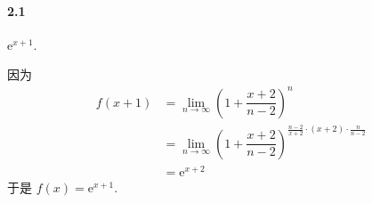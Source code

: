 \paragraph*{2.1} $\mathrm{e}^{x+1}$.

因为 
\[
	\begin{aligned}
	f(x+1)&=\lim_{n\to \infty}\left(1+\dfrac{x+2}{n-2}\right)^n\\
		  &=\lim_{n\to \infty}\left(1+\dfrac{x+2}{n-2}\right)^{\frac{n-2}{x+2}\cdot (x+2)\cdot\frac{n}{n-2}}\\
		  &=\mathrm{e}^{x+2}
	\end{aligned}
\]
于是 $f(x)=\mathrm{e}^{x+1}$.

